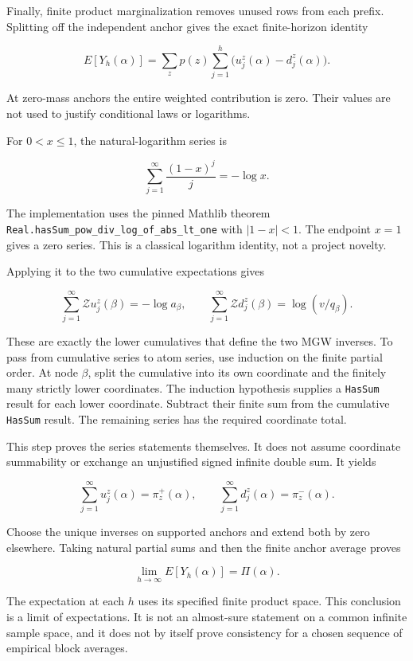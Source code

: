 Finally, finite product marginalization removes unused rows from each prefix. Splitting off the independent anchor gives the exact finite-horizon identity

\[
E[Y_h(\alpha)]
=\sum_zp(z)\sum_{j=1}^h\bigl(u_j^z(\alpha)-d_j^z(\alpha)\bigr).
\]

At zero-mass anchors the entire weighted contribution is zero. Their values are not used to justify conditional laws or logarithms.

\label{why-the-mean-converges-to-the-named-atom}

For \(0<x\le1\), the natural-logarithm series is

\[
\sum_{j=1}^{\infty}\frac{(1-x)^j}{j}=-\log x.
\]

The implementation uses the pinned Mathlib theorem \texttt{Real.hasSum\_pow\_div\_log\_of\_abs\_lt\_one} with \(|1-x|<1\). The endpoint \(x=1\) gives a zero series. This is a classical logarithm identity, not a project novelty.

Applying it to the two cumulative expectations gives

\[
\sum_{j=1}^{\infty}\mathcal Zu_j^z(\beta)=-\log a_\beta,
\qquad
\sum_{j=1}^{\infty}\mathcal Zd_j^z(\beta)=\log(v/q_\beta).
\]

These are exactly the lower cumulatives that define the two MGW inverses. To pass from cumulative series to atom series, use induction on the finite partial order. At node \(\beta\), split the cumulative into its own coordinate and the finitely many strictly lower coordinates. The induction hypothesis supplies a \texttt{HasSum} result for each lower coordinate. Subtract their finite sum from the cumulative \texttt{HasSum} result. The remaining series has the required coordinate total.

This step proves the series statements themselves. It does not assume coordinate summability or exchange an unjustified signed infinite double sum. It yields

\[
\sum_{j=1}^{\infty}u_j^z(\alpha)=\pi_z^+(\alpha),
\qquad
\sum_{j=1}^{\infty}d_j^z(\alpha)=\pi_z^-(\alpha).
\]

Choose the unique inverses on supported anchors and extend both by zero elsewhere. Taking natural partial sums and then the finite anchor average proves

\[
\lim_{h\to\infty} E[Y_h(\alpha)]=\Pi(\alpha).
\]

The expectation at each \(h\) uses its specified finite product space. This conclusion is a limit of expectations. It is not an almost-sure statement on a common infinite sample space, and it does not by itself prove consistency for a chosen sequence of empirical block averages.

